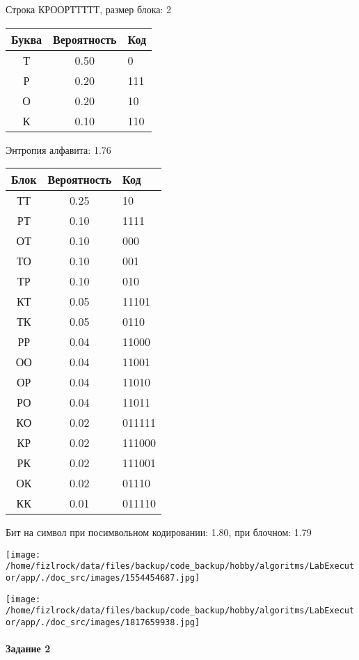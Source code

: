 \documentclass[a4paper, 12pt]{article}
\begin{document}
Строка КРООРТТТТТ, размер блока: 2
\begin{center}
 \begin{tabular}{ |c|c|l| } 
  \hline
     Буква & Вероятность & Код\\ \hline
Т & 0.50 & 0\\\hline
Р & 0.20 & 111\\\hline
О & 0.20 & 10\\\hline
К & 0.10 & 110
\\ \hline \end{tabular}
\end{center}
Энтропия алфавита: 1.76
\begin{center}
 \begin{tabular}{ |c|c|l| } 
  \hline
     Блок & Вероятность & Код\\ \hline
ТТ & 0.25 & 10\\\hline
РТ & 0.10 & 1111\\\hline
ОТ & 0.10 & 000\\\hline
ТО & 0.10 & 001\\\hline
ТР & 0.10 & 010\\\hline
КТ & 0.05 & 11101\\\hline
ТК & 0.05 & 0110\\\hline
РР & 0.04 & 11000\\\hline
ОО & 0.04 & 11001\\\hline
ОР & 0.04 & 11010\\\hline
РО & 0.04 & 11011\\\hline
КО & 0.02 & 011111\\\hline
КР & 0.02 & 111000\\\hline
РК & 0.02 & 111001\\\hline
ОК & 0.02 & 01110\\\hline
КК & 0.01 & 011110
\\ \hline \end{tabular}
\end{center}
Бит на символ при посимвольном кодировании: 1.80, при блочном: 1.79

\texttt{[image: /home/fizlrock/data/files/backup/code\_backup/hobby/algoritms/LabExecutor/app/./doc\_src/images/1554454687.jpg]}

\texttt{[image: /home/fizlrock/data/files/backup/code\_backup/hobby/algoritms/LabExecutor/app/./doc\_src/images/1817659938.jpg]}
\pagebreak
\paragraph{Задание 2}
\end{document}
